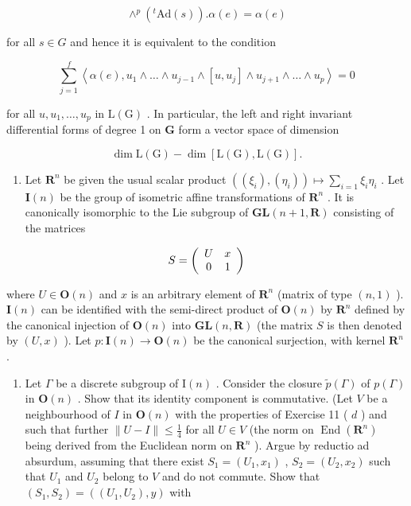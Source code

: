 \[
\wedge^ {p} (^ {t} \mathrm{Ad} (s)). \alpha (e) = \alpha (e)
\]

for all \(s \in G\) and hence it is equivalent to the condition

\[
\sum_ {j = 1} ^ {f} \left\langle \alpha (e), u _ {1} \wedge \dots \wedge u _ {j - 1} \wedge [ u, u _ {j} ] \wedge u _ {j + 1} \wedge \dots \wedge u _ {p} \right\rangle = 0
\]

for all \(u, u_1, \ldots, u_p\) in \(\mathrm{L}(\mathrm{G})\) . In particular, the left and right invariant differential forms of degree 1 on \(\mathbf{G}\) form a vector space of dimension

\[
\dim \mathrm{L} (\mathrm{G}) - \dim [ \mathrm{L} (\mathrm{G}), \mathrm{L} (\mathrm{G}) ].
\]

\begin{enumerate}
\def\labelenumi{\arabic{enumi}.}
\setcounter{enumi}{12}
\tightlist
\item
  Let \(\mathbf{R}^n\) be given the usual scalar product \(((\xi_i), (\eta_i)) \mapsto \sum_{i=1} \xi_i \eta_i\) . Let \(\mathbf{I}(n)\) be the group of isometric affine transformations of \(\mathbf{R}^n\) . It is canonically isomorphic to the Lie subgroup of \(\mathbf{GL}(n + 1, \mathbf{R})\) consisting of the matrices
\end{enumerate}

\[
S = \left( \begin{array}{c c} U & x \\ 0 & 1 \end{array} \right)
\]

where \(U \in \mathbf{O}(n)\) and \(x\) is an arbitrary element of \(\mathbf{R}^n\) (matrix of type \((n,1)\) ). \(\mathbf{I}(n)\) can be identified with the semi-direct product of \(\mathbf{O}(n)\) by \(\mathbf{R}^n\) defined by the canonical injection of \(\mathbf{O}(n)\) into \(\mathbf{GL}(n,\mathbf{R})\) (the matrix \(S\) is then denoted by \((U,x)\) ). Let \(p\colon \mathbf{I}(n)\to \mathbf{O}(n)\) be the canonical surjection, with kernel \(\mathbf{R}^n\) .

\begin{enumerate}
\def\labelenumi{(\alph{enumi})}
\tightlist
\item
  Let \(\Gamma\) be a discrete subgroup of \(\mathrm{I}(n)\) . Consider the closure \(\tilde{p}(\Gamma)\) of \(p(\Gamma)\) in \(\mathbf{O}(n)\) . Show that its identity component is commutative. (Let \(V\) be a neighbourhood of \(I\) in \(\mathbf{O}(n)\) with the properties of Exercise 11 ( \(d\) ) and such that further \(\|U - I\| \leqslant \frac{1}{4}\) for all \(U \in V\) (the norm on \(\operatorname{End}(\mathbf{R}^n)\) being derived from the Euclidean norm on \(\mathbf{R}^n\) ). Argue by reductio ad absurdum, assuming that there exist \(S_1 = (U_1, x_1)\) , \(S_2 = (U_2, x_2)\) such that \(U_1\) and \(U_2\) belong to \(V\) and do not commute. Show that \((S_1, S_2) = ((U_1, U_2), y)\) with
\end{enumerate}


